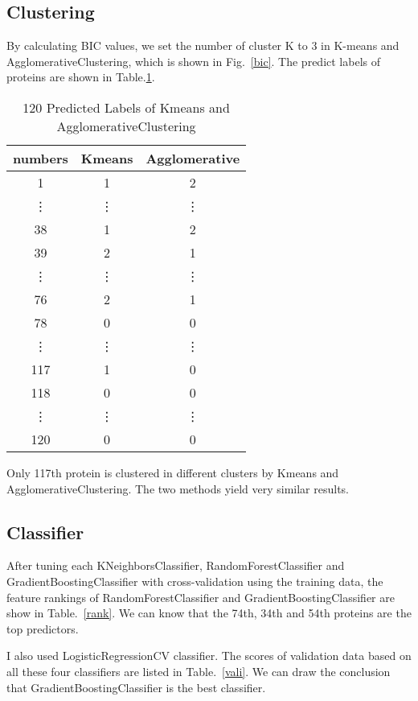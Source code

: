 \documentclass{article}
\begin{document}
\subsection{Clustering}
By calculating BIC values, we set the number of cluster K 	to 3 in K-means and AgglomerativeClustering, which is shown in Fig.~\ref{bic}. The predict labels of proteins are shown in Table.\ref{lables_cluster}.

\begin{table}[h!]
\centering

\caption{120 Predicted Labels of Kmeans and AgglomerativeClustering}
\label{lables_cluster} 
\begin{tabular}{  | c | c | c |  }	
\hline
numbers & Kmeans  & Agglomerative \\
\hline
1 & 1 & 2 \\
\vdots & \vdots & \vdots \\
38 & 1  & 2 \\
39 & 2  & 1 \\
\vdots & \vdots  & \vdots \\
76 & 2  & 1 \\
78 & 0 & 0 \\
\vdots & \vdots  & \vdots \\
\color{red}117 & \color{red}1 &\color{red} 0\\
118 & 0  & 0 \\
\vdots & \vdots  & \vdots \\
120 & 0  & 0\\

\hline

\end{tabular}
\end{table}

Only 117th protein is clustered in different clusters by Kmeans and AgglomerativeClustering. The two methods yield very similar results.

\subsection{Classifier}
After tuning each KNeighborsClassifier, RandomForestClassifier and GradientBoostingClassifier with cross-validation using the training data, the feature rankings of RandomForestClassifier and GradientBoostingClassifier are show in Table.~\ref{rank}. We can know that the 74th, 34th and 54th proteins are the top predictors.

I also used  LogisticRegressionCV classifier. The scores of validation data based on all these four classifiers are listed in Table.~\ref{vali}. We can draw the conclusion that GradientBoostingClassifier is the best classifier.
\end{document}
